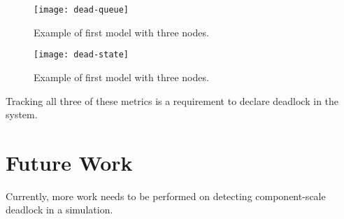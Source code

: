 \documentclass{article}
\begin{document}
\begin{figure}[H]
	\texttt{[image: dead-queue]}\newline
	\centering
	\caption{Example of first model with three nodes.}
	\centering
\end{figure}

\begin{figure}[H]
	\texttt{[image: dead-state]}\newline
	\centering
	\caption{Example of first model with three nodes.}
	\centering
\end{figure}

Tracking all three of these metrics is a requirement to declare deadlock in the system. 




\section{Future Work}
Currently, more work needs to be performed on detecting component-scale deadlock in a simulation.



\end{document}
